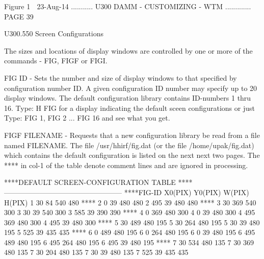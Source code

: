                                     Figure 1
    
   23-Aug-14 ........... U300  DAMM - CUSTOMIZING - WTM ............. PAGE  39
 
   U300.550  Screen Configurations
 
   The sizes and locations of display windows are controlled by  one  or  more
   of the commands - FIG, FIGF or FIGI.
 
   FIG ID - Sets the number and size of display windows to that specified
          by configuration number ID. A given configuration ID number
          may specify up to 20 display windows. The default configuration
          library contains ID-numbers 1 thru 16. Type: H FIG for a
          display indicating the default sceen configurations or just
          Type: FIG 1, FIG 2 ... FIG 16 and see what you get.
 
   FIGF FILENAME - Requests that a new configuration library be read from
          a file named FILENAME. The file /usr/hhirf/fig.dat (or the file
          /home/upak/fig.dat) which contains the default configuration is
          listed on the next next two pages. The **** in col-1 of the table
          denote comment lines and are ignored in processing.
 
   ****DEFAULT SCREEN-CONFIGURATION TABLE
   ****--------------------------------------------------
   ****FIG-ID   X0(PIX)   Y0(PIX)    W(PIX)    H(PIX)
            1        30        84       540       480
   ****
            2         0        39       480       480
            2       495        39       480       480
   ****
            3        30       369       540       300
            3        30        39       540       300
            3       585        39       390       390
   ****
            4         0       369       480       300
            4         0        39       480       300
            4       495       369       480       300
            4       495        39       480       300
   ****
            5        30       489       480       195
            5        30       264       480       195
            5        30        39       480       195
            5       525        39       435       435
   ****
            6         0       489       480       195
            6         0       264       480       195
            6         0        39       480       195
            6       495       489       480       195
            6       495       264       480       195
            6       495        39       480       195
   ****
            7        30       534       480       135
            7        30       369       480       135
            7        30       204       480       135
            7        30        39       480       135
            7       525        39       435       435
 
